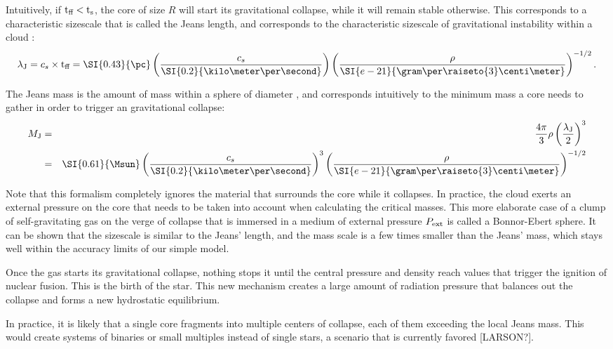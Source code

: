 Intuitively, if $\textrm{t}_\textrm{ff}<\textrm{t}_\textrm{s}$, the core of size $R$ will start its gravitational collapse, while it will remain stable otherwise. This corresponds to a characteristic sizescale that is called the Jeans length, and corresponds to the characteristic sizescale of gravitational instability within a cloud \citep{McKee:2007bd}:
\begin{equation}
 \lambdaJ = \cs\times\tff = \SI{0.43}{\pc}\left(\frac{\cs}{\SI{0.2}{\kilo\meter\per\second}}\right)\left(\frac{\rho}{\SI{e-21}{\gram\per\raiseto{3}\centi\meter}}\right)^{-1/2}.
 \end{equation} 

The Jeans mass is the amount of mass within a sphere of diameter \lambdaJ, and corresponds intuitively to the minimum mass a core needs to gather in order to trigger an gravitational collapse:
\begin{eqnarray}
\MJ &=& \frac{4\pi}{3}\rho\left(\frac{\lambdaJ}{2}\right)^3 \\
&=& \SI{0.61}{\Msun} \left(\frac{\cs}{\SI{0.2}{\kilo\meter\per\second}}\right)^3 \left(\frac{\rho}{\SI{e-21}{\gram\per\raiseto{3}\centi\meter}}\right)^{-1/2}
\end{eqnarray}

Note that this formalism completely ignores the material that surrounds the core while it collapses. In practice, the cloud exerts an external pressure on the core that needs to be taken into account when calculating the critical masses. This more elaborate case of a clump of self-gravitating gas on the verge of collapse that is immersed in a medium of external pressure $P_\textrm{ext} $ is called a Bonnor-Ebert sphere. It can be shown\citep{McKee:2007bd} that the sizescale is similar to the Jeans' length, and the mass scale is a few times smaller than the Jeans' mass, which stays well within the accuracy limits of our simple model.

Once the gas starts its gravitational collapse, nothing stops it until the central pressure and density reach values that trigger the ignition of nuclear fusion. This is the birth of the star. This new mechanism creates a large amount of radiation pressure that balances out the collapse and forms a new hydrostatic equilibrium. 

In practice, it is likely that a single core fragments into multiple centers of collapse, each of them exceeding the local Jeans mass. This would create systems of binaries or small multiples instead of single stars, a scenario that is currently favored [LARSON?].

